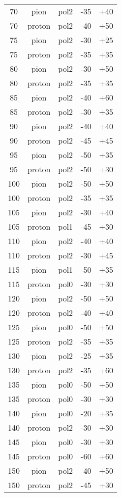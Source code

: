\begin{longtable}{|ccccc|}
70 & pion & pol2 & -35 & +40 \\
70 & proton & pol2 & -40 & +50 \\
75 & pion & pol2 & -30 & +25 \\
75 & proton & pol2 & -35 & +35 \\
80 & pion & pol2 & -30 & +50 \\
80 & proton & pol2 & -35 & +35 \\
85 & pion & pol2 & -40 & +60 \\
85 & proton & pol2 & -30 & +35 \\
90 & pion & pol2 & -40 & +40 \\
90 & proton & pol2 & -45 & +45 \\
95 & pion & pol2 & -50 & +35 \\
95 & proton & pol2 & -50 & +30 \\
100 & pion & pol2 & -50 & +50 \\
100 & proton & pol2 & -35 & +35 \\
105 & pion & pol2 & -30 & +40 \\
105 & proton & pol1 & -45 & +30 \\
110 & pion & pol2 & -40 & +40 \\
110 & proton & pol2 & -30 & +45 \\
115 & pion & pol1 & -50 & +35 \\
115 & proton & pol0 & -30 & +30 \\
120 & pion & pol2 & -50 & +50 \\
120 & proton & pol2 & -40 & +40 \\
125 & pion & pol0 & -50 & +50 \\
125 & proton & pol2 & -35 & +35 \\
130 & pion & pol2 & -25 & +35 \\
130 & proton & pol2 & -35 & +60 \\
135 & pion & pol0 & -50 & +50 \\
135 & proton & pol0 & -30 & +30 \\
140 & pion & pol0 & -20 & +35 \\
140 & proton & pol2 & -30 & +30 \\
145 & pion & pol0 & -30 & +30 \\
145 & proton & pol0 & -60 & +60 \\
150 & pion & pol2 & -40 & +50 \\
150 & proton & pol2 & -45 & +30 \\
\hline
\end{longtable}

